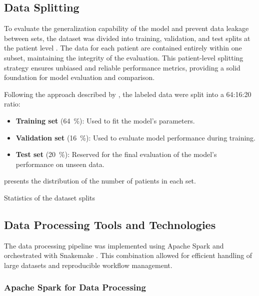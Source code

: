 \subsection{Data Splitting}

To evaluate the generalization capability of the model and prevent data leakage between sets, the dataset was divided into training, validation, and test splits at the patient level \cite{emmert2019evaluation}. The data for each patient are contained entirely within one subset, maintaining the integrity of the evaluation. This patient-level splitting strategy ensures unbiased and reliable performance metrics, providing a solid foundation for model evaluation and comparison.

Following the approach described by \textcite{STraTS2022}, the labeled data were split into a 64:16:20 ratio:

\begin{itemize}
    \item \textbf{Training set} (\qty{64}{\percent}): Used to fit the model's parameters.
    \item \textbf{Validation set} (\qty{16}{\percent}): Used to evaluate model performance during training.
    \item \textbf{Test set} (\qty{20}{\percent}): Reserved for the final evaluation of the model's performance on unseen data.
\end{itemize}

 presents the distribution of the number of patients in each set.

\begin{table}[h!]
    \centering
    \caption{Statistics of the dataset splits}
    \label{tab:split_statistics}
    
\end{table}

\subsection{Data Processing Tools and Technologies}

The data processing pipeline was implemented using Apache Spark \cite{ApacheSpark} and orchestrated with Snakemake \cite{SnakeMake}. This combination allowed for efficient handling of large datasets and reproducible workflow management.

\subsubsection{Apache Spark for Data Processing}

